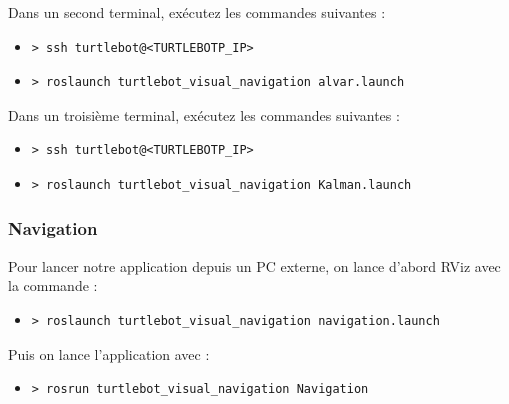 \documentclass[10pt,a4paper]{article}
\begin{document}
Dans un second terminal, exécutez les commandes suivantes :

\begin{itemize}
\item[]  \begin{verbatim}> ssh turtlebot@<TURTLEBOTP_IP> \end{verbatim}
\item[]  \begin{verbatim}> roslaunch turtlebot_visual_navigation alvar.launch \end{verbatim}
\end{itemize}

Dans un troisième terminal, exécutez les commandes suivantes :

\begin{itemize}
\item[]  \begin{verbatim}> ssh turtlebot@<TURTLEBOTP_IP> \end{verbatim}
\item[]  \begin{verbatim}> roslaunch turtlebot_visual_navigation Kalman.launch \end{verbatim}
\end{itemize}

\subsubsection{Navigation}

Pour lancer notre application depuis un PC externe, on lance d'abord RViz avec la commande :
\begin{itemize}
\item[]  \begin{verbatim}> roslaunch turtlebot_visual_navigation navigation.launch \end{verbatim}
\end{itemize}

Puis on lance l'application avec :
\begin{itemize}
\item[]  \begin{verbatim}> rosrun turtlebot_visual_navigation Navigation \end{verbatim}
\end{itemize}

\end{document}
